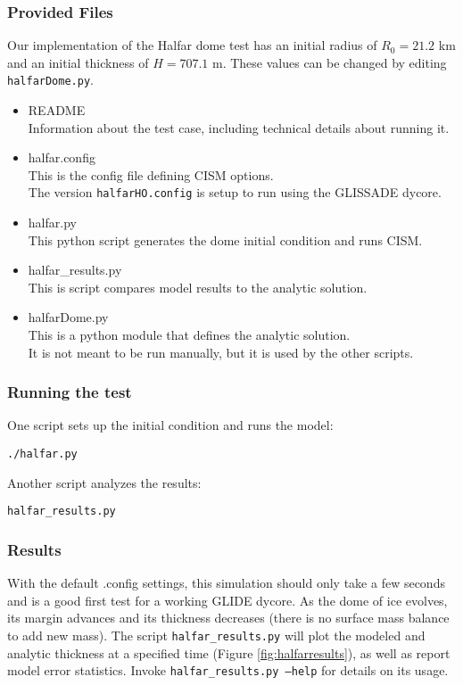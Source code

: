 \subsubsection{Provided Files}
\label{subsec:halfar_files}

Our implementation of the Halfar dome test has an initial radius of $R_0=21.2$ km and an initial thickness of $H=707.1$ m.
These values can be changed by editing \texttt{halfarDome.py}.

\begin{itemize}
	\item README \\
		Information about the test case, including technical details about running it.
	\item halfar.config \\
		This is the config file defining CISM options. \\
              The version \texttt{halfarHO.config} is setup to run using the GLISSADE dycore.
	\item halfar.py \\
		This python script generates the dome initial condition and runs CISM.
	\item halfar\_results.py \\
		This is script compares model results to the analytic solution.
	\item halfarDome.py \\
		This is a python module that defines the analytic solution. \\
    		 It is not meant to be run manually, but it is used by the other scripts.
\end{itemize}

\subsubsection{Running the test}
One script sets up the initial condition and runs the model:

\texttt{./halfar.py}

Another script analyzes the results:

\texttt{halfar\_results.py}

\subsubsection{Results}
\label{subsecc:halfar_results}
With the default .config settings, this simulation should only take a few seconds and is a good first test for a working GLIDE dycore.
As the dome of ice evolves, its margin advances and its thickness decreases (there is no surface mass balance to add new mass).  The script \texttt{halfar\_results.py} will plot the modeled and analytic thickness at a specified time (Figure \ref{fig:halfarresults}), as well as report model error statistics.  Invoke \texttt{halfar\_results.py --help} for details on its usage.


